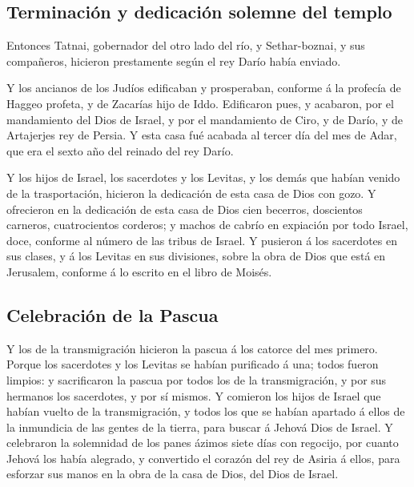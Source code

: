 \hypertarget{terminaciuxf3n-y-dedicaciuxf3n-solemne-del-templo}{%
\subsection{Terminación y dedicación solemne del
templo}\label{terminaciuxf3n-y-dedicaciuxf3n-solemne-del-templo}}

 Entonces Tatnai, gobernador del otro lado del río, y
Sethar-boznai, y sus compañeros, hicieron prestamente según el rey Darío
había enviado.

 Y los ancianos de los Judíos edificaban y prosperaban,
conforme á la profecía de Haggeo profeta, y de Zacarías hijo de Iddo.
Edificaron pues, y acabaron, por el mandamiento del Dios de Israel, y
por el mandamiento de Ciro, y de Darío, y de Artajerjes rey de Persia.
 Y esta casa fué acabada al tercer día del mes de Adar, que
era el sexto año del reinado del rey Darío.

 Y los hijos de Israel, los sacerdotes y los Levitas, y los
demás que habían venido de la trasportación, hicieron la dedicación de
esta casa de Dios con gozo.  Y ofrecieron en la dedicación
de esta casa de Dios cien becerros, doscientos carneros, cuatrocientos
corderos; y machos de cabrío en expiación por todo Israel, doce,
conforme al número de las tribus de Israel.  Y pusieron á
los sacerdotes en sus clases, y á los Levitas en sus divisiones, sobre
la obra de Dios que está en Jerusalem, conforme á lo escrito en el libro
de Moisés.

\hypertarget{celebraciuxf3n-de-la-pascua}{%
\subsection{Celebración de la
Pascua}\label{celebraciuxf3n-de-la-pascua}}

 Y los de la transmigración hicieron la pascua á los
catorce del mes primero.  Porque los sacerdotes y los
Levitas se habían purificado á una; todos fueron limpios: y sacrificaron
la pascua por todos los de la transmigración, y por sus hermanos los
sacerdotes, y por sí mismos.  Y comieron los hijos de
Israel que habían vuelto de la transmigración, y todos los que se habían
apartado á ellos de la inmundicia de las gentes de la tierra, para
buscar á Jehová Dios de Israel.  Y celebraron la solemnidad
de los panes ázimos siete días con regocijo, por cuanto Jehová los había
alegrado, y convertido el corazón del rey de Asiria á ellos, para
esforzar sus manos en la obra de la casa de Dios, del Dios de Israel.

